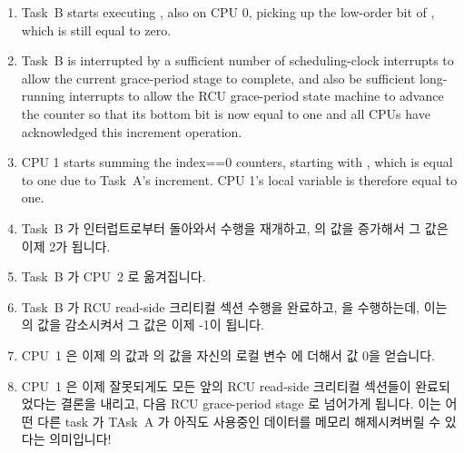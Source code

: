 {\begin{enumerate}
	\item	Task~B starts executing , also on
		CPU 0, picking up the low-order bit of
		, which is still equal to zero.
	\item	Task~B is interrupted by a sufficient number of scheduling-clock
		interrupts to allow the current grace-period stage to complete,
		and also be sufficient long-running interrupts to allow the
		RCU grace-period state machine to advance the
		 counter so that its bottom bit
		is now equal to one and all CPUs have acknowledged this
		increment operation.
	\item	CPU 1 starts summing the index==0 counters, starting with
		, which is equal to one
		due to Task~A's increment.
		CPU 1's local variable  is therefore equal to one.
	\fi
	\item	Task~B 가 인터럽트로부터 돌아와서  수행을
		재개하고,  의 값을 증가해서 그
		값은 이제 2가 됩니다.
	\item	Task~B 가 CPU~2 로 옮겨집니다.
	\item	Task~B 가 RCU read-side 크리티컬 섹션 수행을 완료하고,
		 을 수행하는데, 이는
		 의 값을 감소시켜서 그 값은 이제
		-1이 됩니다.
	\item	CPU~1 은 이제  의 값과
		 의 값을 자신의 로컬 변수
		 에 더해서 값 0을 얻습니다.
	\item	CPU~1 은 이제 잘못되게도 모든 앞의 RCU read-side 크리티컬
		섹션들이 완료되었다는 결론을 내리고, 다음 RCU grace-period
		stage 로 넘어가게 됩니다.
		이는 어떤 다른 task 가 TAsk~A 가 아직도 사용중인 데이터를
		메모리 해제시켜버릴 수 있다는 의미입니다!

	\end{enumerate}

}
